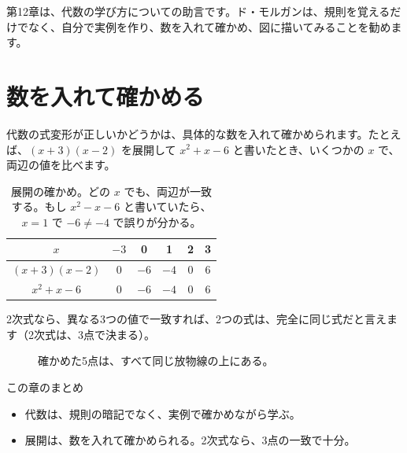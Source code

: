 \documentclass[a4paper,11pt,openany]{ltjsbook}
\begin{document}
第12章は、代数の学び方についての助言です。ド・モルガンは、規則を覚えるだけでなく、自分で実例を作り、数を入れて確かめ、図に描いてみることを勧めます。

\section{数を入れて確かめる}

代数の式変形が正しいかどうかは、具体的な数を入れて確かめられます。たとえば、$(x+3)(x-2)$ を展開して $x^2+x-6$ と書いたとき、いくつかの $x$ で、両辺の値を比べます。

\begin{table}[htbp]
\centering
\begin{tabular}{c|ccccc}
\toprule
$x$ & $-3$ & 0 & 1 & 2 & 3\\
\midrule
$(x+3)(x-2)$ & 0 & $-6$ & $-4$ & 0 & 6\\
$x^2+x-6$ & 0 & $-6$ & $-4$ & 0 & 6\\
\bottomrule
\end{tabular}
\caption{展開の確かめ。どの $x$ でも、両辺が一致する。もし $x^2-x-6$ と書いていたら、$x=1$ で $-6\ne-4$ で誤りが分かる。}
\end{table}

2次式なら、異なる3つの値で一致すれば、2つの式は、完全に同じ式だと言えます（2次式は、3点で決まる）。

\begin{figure}[htbp]
\centering
{}
\caption{確かめた5点は、すべて同じ放物線の上にある。}
\end{figure}

\begin{pointbox}{この章のまとめ}
\begin{itemize}[leftmargin=*]
\item 代数は、規則の暗記でなく、実例で確かめながら学ぶ。
\item 展開は、数を入れて確かめられる。2次式なら、3点の一致で十分。
\end{itemize}
\end{pointbox}
\end{document}
